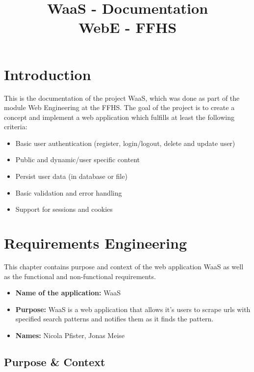 \documentclass[titlepage, 12pt]{article}
\author{\authorName}
\title{WaaS - Documentation \\ \medskip \large WebE - FFHS}
\begin{document}
\maketitle

\pagebreak

\renewcommand{\contentsname}{Table of Contents}

\tableofcontents

\pagebreak

\section{Introduction}

This is the documentation of the project WaaS, which was done as part of the module Web Engineering at the FFHS. The goal of the project is to create a concept and implement a web application which fulfills at least the following criteria:

\begin{itemize}
    \item Basic user authentication (register, login/logout, delete and update user)
    \item Public and dynamic/user specific content
    \item Persist user data (in database or file)
    \item Basic validation and error handling
    \item Support for sessions and cookies
\end{itemize}

\section{Requirements Engineering\label{sectionRequirementsEngineering}}

This chapter contains purpose and context of the web application WaaS as well as the functional and non-functional requirements.

\begin{itemize}
  \item \textbf{Name of the application:} WaaS
  \item \textbf{Purpose:} WaaS is a web application that allows it's users to scrape urls with specified search patterns and notifies them as it finds the pattern.
  \item \textbf{Names:} Nicola Pfister, Jonas Meise
\end{itemize}

\subsection{Purpose \& Context}
\end{document}
